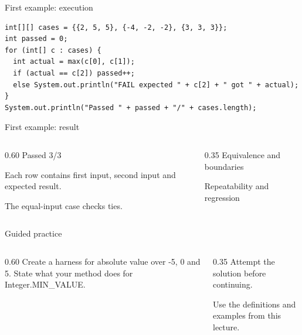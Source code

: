 \documentclass[10pt,aspectratio=169]{beamer}
\begin{document}
\begin{frame}[fragile,t]{First example: execution}
\begin{lstlisting}
int[][] cases = {{2, 5, 5}, {-4, -2, -2}, {3, 3, 3}};
int passed = 0;
for (int[] c : cases) {
  int actual = max(c[0], c[1]);
  if (actual == c[2]) passed++;
  else System.out.println("FAIL expected " + c[2] + " got " + actual);
}
System.out.println("Passed " + passed + "/" + cases.length);
\end{lstlisting}
\end{frame}

\begin{frame}[fragile,t]{First example: result}
\begin{columns}[T,onlytextwidth]\begin{column}{0.60\textwidth}
Passed 3/3\par Each row contains first input, second input and expected result.\par The equal-input case checks ties.
\end{column}\begin{column}{0.35\textwidth}\small
Equivalence and boundaries

Repeatability and regression
\end{column}\end{columns}
\end{frame}

\begin{frame}[fragile,t]{Guided practice}
\begin{columns}[T,onlytextwidth]\begin{column}{0.60\textwidth}
Create a harness for absolute value over -5, 0 and 5. State what your method does for Integer.MIN\_VALUE.
\end{column}\begin{column}{0.35\textwidth}\small
Attempt the solution before continuing.

Use the definitions and examples from this lecture.
\end{column}\end{columns}
\end{frame}
\end{document}
